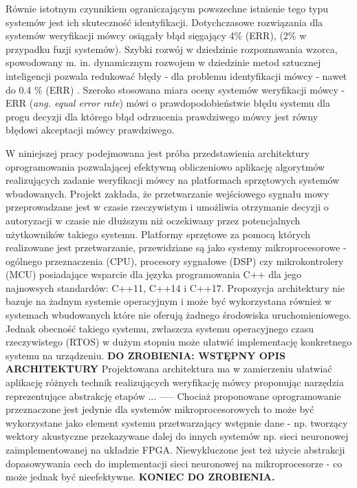 Równie istotnym czynnikiem ograniczającym powszechne istnienie tego typu systemów jest ich skuteczność identyfikacji. Dotychczasowe rozwiązania dla systemów weryfikacji mówcy osiągały błąd sięgający 4\% (ERR), (2\% w przypadku fuzji systemów)\cite{overview}. Szybki rozwój w dziedzinie rozpoznawania wzorca, spowodowany m. in. dynamicznym rozwojem w dziedzinie metod sztucznej inteligencji pozwala redukować błędy - dla problemu identyfikacji mówcy - nawet do 0.4 \% (ERR) \cite{deepfeaturelearning2017err}. Szeroko stosowana miara oceny systemów weryfikacji mówcy - ERR (\textit{ang. equal error rate}) mówi o prawdopodobieństwie błędu systemu dla progu decyzji dla którego błąd odrzucenia prawdziwego mówcy jest równy błędowi akceptacji mówcy prawdziwego.  

W niniejszej pracy podejmowana jest próba przedstawienia architektury oprogramowania pozwalającej efektywną obliczeniowo aplikację algorytmów realizujących zadanie weryfikacji mówcy na platformach sprzętowych systemów wbudowanych. Projekt zakłada, że przetwarzanie wejściowego sygnału mowy przeprowadzane jest w czasie rzeczywistym i umożliwia otrzymanie decyzji o autoryzacji w czasie nie dłuższym niż oczekiwany przez potencjalnych użytkowników takiego systemu. Platformy sprzętowe za pomocą których realizowane jest przetwarzanie, przewidziane są jako systemy mikroprocesorowe - ogólnego przeznaczenia (CPU), procesory sygnałowe (DSP) czy mikrokontrolery (MCU) posiadające wsparcie dla języka programowania C++ dla jego najnowsych standardów: C++11, C++14 i C++17. Propozycja architektury nie bazuje na żadnym systemie operacyjnym i może być wykorzystana również w systemach wbudowanych które nie oferują żadnego środowiska uruchomieniowego. Jednak obecność takiego systemu, zwłaszcza systemu operacyjnego czasu rzeczywistego (RTOS) w dużym stopniu może ułatwić implementację konkretnego systemu na urządzeniu. 
\textbf{DO ZROBIENIA: WSTĘPNY OPIS ARCHITEKTURY}
Projektowana architektura ma w zamierzeniu ułatwiać aplikację różnych technik realizujących weryfikację mówcy proponując narzędzia reprezentujące abstrakcję etapów  ... %
----- Chociaż proponowane oprogramowanie przeznaczone jest jedynie dla systemów mikroprocesorowych to może być wykorzystane jako element systemu przetwarzający wstępnie dane - np. tworzący wektory akustyczne przekazywane dalej do innych systemów np. sieci neuronowej zaimplementowanej na układzie FPGA. Niewykluczone jest też użycie abstrakcji dopasowywania cech do implementacji sieci neuronowej na mikroprocesorze - co może jednak być nieefektywne. %
\textbf{KONIEC DO ZROBIENIA.}


